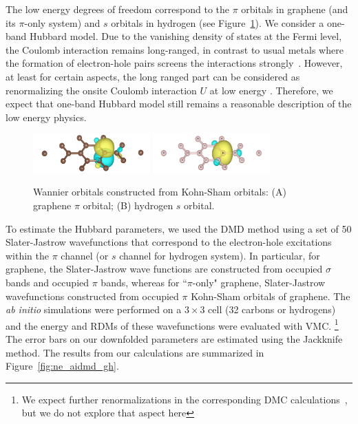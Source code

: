 The low energy degrees of freedom correspond to the $\pi$ orbitals in graphene (and its $\pi$-only system) 
and $s$ orbitals in hydrogen (see Figure~\ref{fig:honeycomb_wan}). 
We consider a one-band Hubbard model. 
Due to the vanishing density of states at the Fermi level, the Coulomb interaction remains long-ranged, in contrast to usual 
metals where the formation of electron-hole pairs screens the interactions strongly~\cite{Zheng2016}. 
However, at least for certain aspects, the long ranged part can be considered as renormalizing the 
onsite Coulomb interaction $U$ at low energy \cite{Schuler2013, Changlani2015}. 
Therefore, we expect that one-band Hubbard model still remains a reasonable description of the low energy physics. 
\begin{figure}[hbt]
\centering
\includegraphics[width=0.40\textwidth]{./Figures/c_pi.png}
\includegraphics[width=0.40\textwidth]{./Figures/h_wan.png}
\caption{Wannier orbitals constructed from Kohn-Sham orbitals: (A) graphene $\pi$ orbital; (B) hydrogen $s$ orbital. }
\label{fig:honeycomb_wan}
\end{figure}

To estimate the Hubbard parameters, we used the DMD method using a set of 50 Slater-Jastrow wavefunctions that correspond 
to the electron-hole excitations within the $\pi$ channel (or $s$ channel for hydrogen system). In particular, for graphene, 
the Slater-Jastrow wave functions are constructed from occupied $\sigma$ bands and occupied $\pi$ bands, whereas for ``$\pi$-only" graphene, 
Slater-Jastrow wavefunctions constructed from occupied $\pi$ Kohn-Sham orbitals of graphene. The \textit{ab initio} simulations 
were performed on a $3\times3$ cell (32 carbons or hydrogens) and the energy and RDMs of these wavefunctions were
evaluated with VMC. \footnote{We expect further renormalizations in the corresponding DMC calculations~\cite{Changlani2015}, 
but we do not explore that aspect here} The error bars on our downfolded parameters are estimated using the Jackknife method. 
The results from our calculations are summarized in %
Figure~\ref{fig:ne_aidmd_gh}.%

